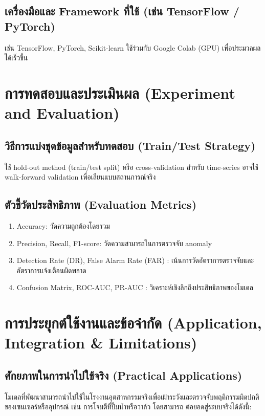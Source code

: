 \subsection{เครื่องมือและ Framework ที่ใช้ (เช่น TensorFlow / PyTorch)}
\hspace{2em} เช่น TensorFlow, PyTorch, Scikit-learn ใช้ร่วมกับ Google Colab (GPU) เพื่อประมวลผลได้เร็วขึ้น

\section{การทดสอบและประเมินผล (Experiment and Evaluation)}

\subsection{วิธีการแบ่งชุดข้อมูลสำหรับทดสอบ (Train/Test Strategy)}
\hspace{2em} ใช้ hold-out method (train/test split) หรือ cross-validation สำหรับ time-series อาจใช้ walk-forward validation เพื่อเลียนแบบสถานการณ์จริง

\subsection{ตัวชี้วัดประสิทธิภาพ (Evaluation Metrics)}
\begin{enumerate}
  \item Accuracy: วัดความถูกต้องโดยรวม
  \item Precision, Recall, F1-score: วัดความสามารถในการตรวจจับ anomaly
  \item Detection Rate (DR), False Alarm Rate (FAR) : เน้นการวัดอัตราการตรวจจับและอัตราการแจ้งเตือนผิดพลาด
  \item Confusion Matrix, ROC-AUC, PR-AUC : วิเคราะห์เชิงลึกถึงประสิทธิภาพของโมเดล
\end{enumerate}

\section{การประยุกต์ใช้งานและข้อจำกัด (Application, Integration \& Limitations)}

\subsection{ ศักยภาพในการนำไปใช้จริง (Practical Applications)}
\hspace{2em} โมเดลที่พัฒนาสามารถนำไปใช้ในโรงงานอุตสาหกรรมจริงเพื่อเฝ้าระวังและตรวจจับพฤติกรรมผิดปกติของเซนเซอร์หรืออุปกรณ์ เช่น การโจมตีที่ปั๊มน้ำหรือวาล์ว โดยสามารถ ต่อยอดสู่ระบบจริงได้ดังนี้:

